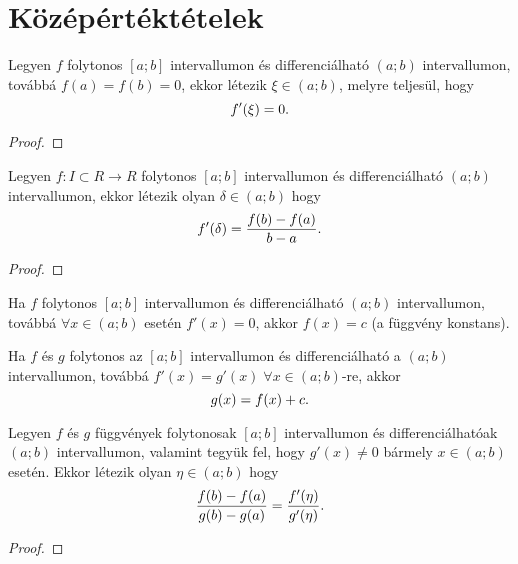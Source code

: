\section{Középértéktételek}\label{section.6.3}

\begin{theorem}
  Legyen $f$ folytonos $[a; b]$ intervallumon és differenciálható $(a; b)$
  intervallumon, továbbá $f(a) = f(b) = 0$, ekkor létezik $ \xi \in (a; b)$,
  melyre teljesül, hogy
  \[
    f'(\xi) = 0
    \text.
  \]

  \begin{proof}
    \phantom{alma}\vspace{7cm}\phantom{alma}
  \end{proof}
\end{theorem}

\begin{theorem}
  Legyen $f : I \subset R \to R$ folytonos $[a; b]$ intervallumon és
  differenciálható $(a; b)$ intervallumon, ekkor létezik olyan $\delta \in
    (a; b)$ hogy
  \[
    f'(\delta) = \frac{f(b)-f(a)}{b-a}
    \text.
  \]

  \begin{proof}
    \phantom{alma}\vspace{12cm}\phantom{alma}
  \end{proof}
\end{theorem}

\begin{theorem}
  Ha $f$ folytonos $[a; b]$ intervallumon és differenciálható $(a; b)$
  intervallumon, továbbá $\forall x \in (a; b)$ esetén $f'(x) = 0$, akkor
  $f(x) = c$ (a függvény konstans).
\end{theorem}

\begin{theorem}
  Ha $f$ és $g$ folytonos az $[a; b]$ intervallumon és differenciálható a
  $(a; b)$ intervallumon, továbbá $f'(x) = g'(x) \; \forall x\in (a; b)$-re,
  akkor
  \[
    g(x) = f(x) +c
    \text.
  \]
\end{theorem}

\begin{theorem}
  Legyen $f$ és $g$ függvények folytonosak $[a; b]$ intervallumon és
  differenciálhatóak $(a; b)$ intervallumon, valamint tegyük fel, hogy $g'(x)
    \neq 0$ bármely $x \in (a; b)$ esetén. Ekkor létezik olyan $\eta \in
    (a; b)$
  hogy
  \[
    \frac{f(b)-f(a)}{g(b)-g(a)} = \frac{f'(\eta)}{g'(\eta)}
    \text.
  \]

  \begin{proof}
    \phantom{alma}\vspace{14cm}\phantom{alma}
  \end{proof}
\end{theorem}


